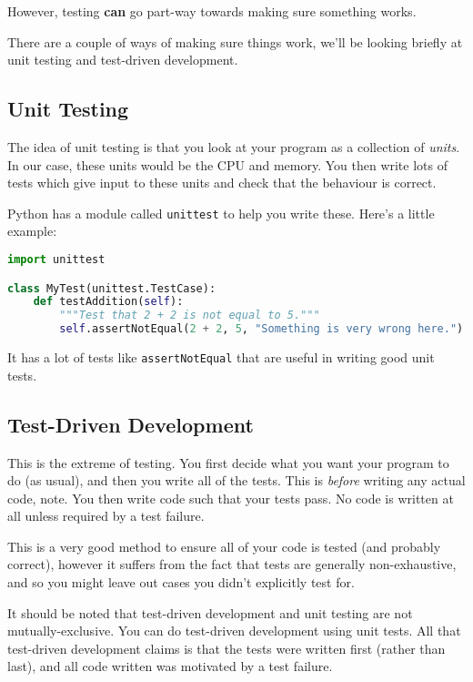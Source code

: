 \documentclass[12pt,a4paper]{article}
\begin{document}
However, testing \textbf{can} go part-way towards making sure
something works.

There are a couple of ways of making sure things work, we'll be
looking briefly at unit testing and test-driven development.

\subsection{Unit Testing}

The idea of unit testing is that you look at your program as a
collection of \textit{units}. In our case, these units would be the
CPU and memory. You then write lots of tests which give input to these
units and check that the behaviour is correct.

Python has a module called \texttt{unittest} to help you write
these. Here's a little example:

\begin{lstlisting}[language=python]
import unittest

class MyTest(unittest.TestCase):
    def testAddition(self):
        """Test that 2 + 2 is not equal to 5."""
        self.assertNotEqual(2 + 2, 5, "Something is very wrong here.")
\end{lstlisting}

It has a lot of tests like \texttt{assertNotEqual} that are useful in
writing good unit tests.

\subsection{Test-Driven Development}

This is the extreme of testing. You first decide what you want your
program to do (as usual), and then you write all of the tests. This is
\textit{before} writing any actual code, note. You then write code
such that your tests pass. No code is written at all unless required
by a test failure.

This is a very good method to ensure all of your code is tested (and
probably correct), however it suffers from the fact that tests are
generally non-exhaustive, and so you might leave out cases you didn't
explicitly test for.

It should be noted that test-driven development and unit testing are
not mutually-exclusive. You can do test-driven development using unit
tests. All that test-driven development claims is that the tests were
written first (rather than last), and all code written was motivated
by a test failure.
\end{document}
